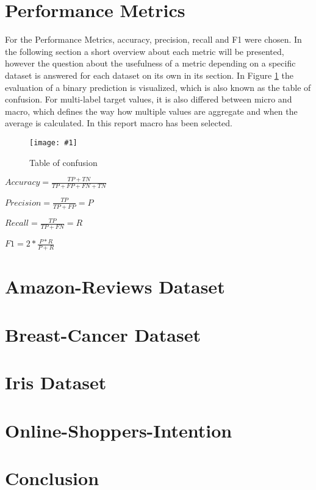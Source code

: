 \documentclass{article}
\newcommand{\size}{0.8\textwidth}
\newcommand{\image}[3]{
\begin{figure}
\begin{center}
\texttt{[image: \#1]}
\caption{#2}
#3
\end{center}
\end{figure}
}
\begin{document}
\section{Performance Metrics}
For the Performance Metrics, accuracy, precision, recall and F1 were chosen. In the following section a short overview about each metric will be presented, however the question about the usefulness of a metric depending on a specific dataset is answered for each dataset on its own in its section. In Figure \ref{fig:conf} the evaluation of a binary prediction is visualized, which is also known as the table of confusion. For multi-label target values, it is also differed between micro and macro, which defines the way how multiple values are aggregate and when the average is calculated. In this report macro has been selected.

\image{performance.png}{Table of confusion}{\label{fig:conf}}
\begin{itemize}
\Large{
\item $Accuracy = \frac{TP + TN}{TP + FP + FN + TN}$

\item $Precision = \frac{TP}{TP+FP} = P$

\item $Recall = \frac{TP}{TP+FN} = R$

\item $F1=2*\frac{P*R}{P+R}$
}
\end{itemize}

\section{Amazon-Reviews Dataset}


\section{Breast-Cancer Dataset}


\section{Iris Dataset}


\section{Online-Shoppers-Intention}


\section{Conclusion}
\end{document}
